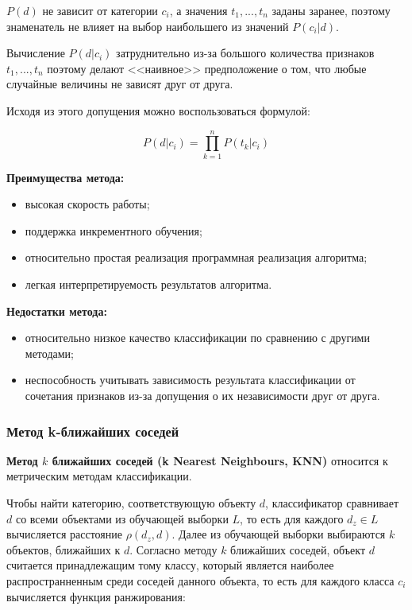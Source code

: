 \documentclass[utf8x, 14pt, oneside, a4paper]{article}
\begin{document}
	$P(d)$ не зависит от категории $c_i$, а значения $t_1, ..., t_n$ заданы заранее, поэтому знаменатель не влияет на выбор наибольшего из значений $P(c_i|d)$.
	
	Вычисление $P(d|c_i)$ затруднительно из-за большого количества признаков $t_1, ..., t_n$ поэтому делают <<наивное>> предположение о том, что любые случайные величины не зависят друг от друга.
	
	Исходя из этого допущения можно воспользоваться формулой:
	
	\begin{equation}
		P(d|c_i) = \prod_{k=1}^{n} P(t_k|c_i)
	\end{equation}

	\begin{flushleft}
		{\bf Преимущества метода:}
	\end{flushleft}
	
	\begin{itemize}
		\item высокая скорость работы;
		\item поддержка инкрементного обучения;
		\item относительно простая реализация программная реализация алгоритма;
		\item легкая интерпретируемость результатов алгоритма.
	\end{itemize}

	\begin{flushleft}
		{\bf Недостатки метода:}
	\end{flushleft}

	\begin{itemize}
		\item относительно низкое качество классификации по сравнению с другими методами;
		\item неспособность учитывать зависимость результата классификации от сочетания признаков из-за допущения о их независимости друг от друга.
	\end{itemize}
		
	\subsubsection{Метод k-ближайших соседей}
	
	{\bf Метод $k$ ближайших соседей (k Nearest Neighbours, KNN)} относится к метрическим методам классификации. 
	
	Чтобы найти категорию, соответствующую объекту $d$, классификатор сравнивает $d$ со всеми объектами из обучающей выборки $L$, то есть для каждого $d_z \in L$ вычисляется расстояние $ρ(d_z, d)$. Далее из обучающей выборки выбираются $k$ объектов, ближайших к $d$. Согласно методу $k$ ближайших соседей, объект $d$ считается принадлежащим тому классу, который является наиболее распространненным среди соседей данного объекта, то есть для каждого класса $c_i$ вычисляется функция ранжирования:
	
\end{document}
